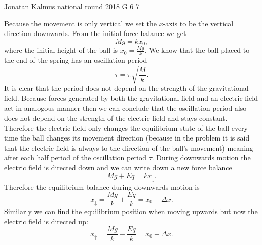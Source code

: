 \documentclass[11pt]{article}
\begin{document}
{Jonatan Kalmus} %
{national round} %
{2018} %
{G 6} %
{7} %
{

\ifEngSolution
Because the movement is only vertical we set the $x$-axis to be the vertical direction downwards. From the initial force balance we get
$$Mg = kx_0,$$
where the initial height of the ball is $x_0 = \frac{Mg}{k}$. We know that the ball placed to the end of the spring has an oscillation period
$$\tau = \pi \sqrt{\frac{M}{k}}.$$ 
It is clear that the period does not depend on the strength of the gravitational field. Because forces generated by both the gravitational field and an electric field act in analogous manner then we can conclude that the oscillation period also does not depend on the strength of the electric field and stays constant. Therefore the electric field only changes the equilibrium state of the ball every time the ball changes its movement direction (because in the problem it is said that the electric field is always to the direction of the ball’s movement) meaning after each half period of the oscillation period $\tau$. During downwards motion the electric field is directed down and we can write down a new force balance
$$Mg + Eq = kx_\downarrow.$$ 
Therefore the equilibrium balance during downwards motion is 
$$x_\downarrow = \frac{Mg}{k} + \frac{Eq}{k} = x_0 + \Delta x.$$ 
Similarly we can find the equilibrium position when moving upwards but now the electric field is directed up:
$$x_\uparrow = \frac{Mg}{k} - \frac{Eq}{k} = x_0 - \Delta x.$$ 
}
\end{document}
